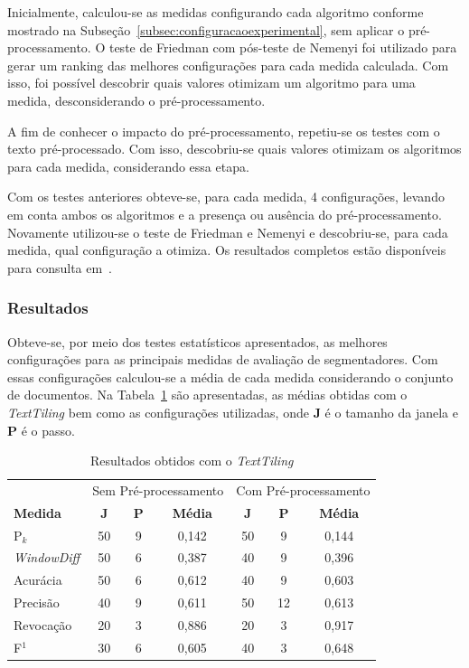 Inicialmente, calculou-se as medidas configurando cada algoritmo conforme mostrado na Subseção~\ref{subsec:configuracaoexperimental}, sem aplicar o pré-processamento. O teste de Friedman com pós-teste de Nemenyi foi utilizado para gerar um ranking das melhores configurações para cada medida calculada. Com isso, foi possível descobrir quais valores otimizam um algoritmo para uma medida, 	desconsiderando o pré-processamento. 

A fim de conhecer o impacto do pré-processamento, repetiu-se os testes com o texto pré-processado. Com isso, descobriu-se quais valores otimizam os algoritmos para cada medida, considerando essa etapa.

Com os testes anteriores obteve-se, para cada medida, 4 configurações, levando em conta ambos os algoritmos e a presença ou ausência do pré-processamento. Novamente utilizou-se o teste de Friedman e Nemenyi e descobriu-se, para cada medida, qual configuração a otimiza. Os resultados completos estão disponíveis para consulta em~\urlsoftwares.




\subsubsection{Resultados}


Obteve-se, por meio dos testes estatísticos apresentados, as melhores configurações para as principais medidas de avaliação de segmentadores. Com essas configurações calculou-se a média de cada medida considerando o conjunto de documentos. Na Tabela~\ref{tab:resultadosTT} são apresentadas, as médias obtidas com o \textit{TextTiling} bem como as configurações utilizadas, onde \textbf{J} é o tamanho da janela e \textbf{P} é o passo.


\begin{table}[!h]
	\centering
	\begin{tabular}{|l||c|c|c||c|c|c|} \hline

		& \multicolumn{3}{c||}{Sem Pré-processamento} 
		& \multicolumn{3}{c|}{Com Pré-processamento}\\			

		\textbf{Medida} & 
		\textbf{J} &
		\textbf{P} & 
		\textbf{Média} &
		\textbf{J} &
		\textbf{P} & 
		\textbf{Média} \\	\hline

		P$_k$				& 50 & 9 & 0,142 & 50 & 9  & 0,144 \\ \hline
		\textit{WindowDiff}	& 50 & 6 & 0,387 & 40 & 9  & 0,396 \\ \hline
		Acurácia			& 50 & 6 & 0,612 & 40 & 9  & 0,603 \\ \hline
		Precisão			& 40 & 9 & 0,611 & 50 & 12 & 0,613 \\ \hline
		Revocação			& 20 & 3 & 0,886 & 20 & 3  & 0,917 \\ \hline
		F$^1$				& 30 & 6 & 0,605 & 40 & 3  & 0,648 \\ \hline

	\end{tabular}
	\caption{Resultados obtidos com o \textit{TextTiling}}
	\label{tab:resultadosTT}
\end{table}




